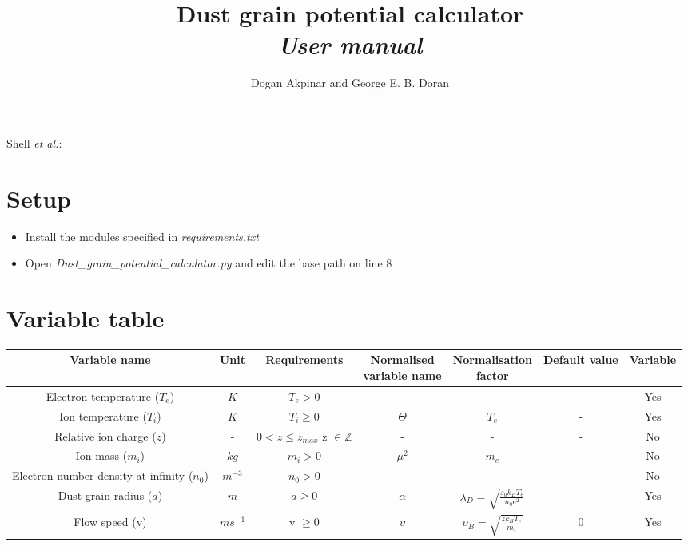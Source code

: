 \documentclass{journal}
\begin{document}
\title{Dust grain potential calculator \\ \it{User manual}}
\author{Dogan Akpinar and George E. B. Doran}
{Shell \MakeLowercase{\textit{et al.}}:}

\maketitle

\section{Setup}

\begin{itemize}
    \item Install the modules specified in \textit{requirements.txt}
    \item Open \textit{Dust\_grain\_potential\_calculator.py} and edit the base path on line 8
\end{itemize}

\section{Variable table}

\begin{table}[H]
    \begin{adjustwidth}{-2.5cm}{}
        \label{tab:ValueTable}
        \begin{tabular}{|c|c|c|c|c|c|c|} 
        \hline
        Variable name & Unit & Requirements & \makecell{Normalised \\ variable name} & \makecell{Normalisation \\ factor} & Default value & Variable\\
        \hline
        Electron temperature ($T_e$) & $K$ & $T_e > 0$ & - & - & - & Yes \\
        \hline
        Ion temperature ($T_i$) & $K$ & $T_i \geq 0$ & $\Theta$ & $T_e$ & - & Yes \\
        \hline
        Relative ion charge ($z$) & - & \makecell{$0 < z \leq z_{max}$ \\ z $\in \mathds{Z}$} & - & - & - & No \\
        \hline
        Ion mass ($m_i$) & $kg$ & $m_i > 0$ & $\mu^2$ & $m_e$ & - & No \\
        \hline
        \makecell{Electron number density \\ at infinity ($n_0$)} & $m^{-3}$ & $n_0>0$ & - & - & - & No\\
        \hline
        Dust grain radius ($a$) & $m$ & $a \geq 0$ & $\alpha$ & $\lambda_D = \sqrt{\frac{\varepsilon_0 k_B T_e}{n_0 e^2}}$ & - & Yes\\
        \hline
        Flow speed (v) & $ms^{-1}$ & v $\geq 0$ & $\upsilon$ & $\upsilon_B = \sqrt{\frac{z k_B T_e}{m_i}}$ & 0 & Yes \\
        \hline
        \end{tabular}
    \end{adjustwidth}
\end{table}
\end{document}
